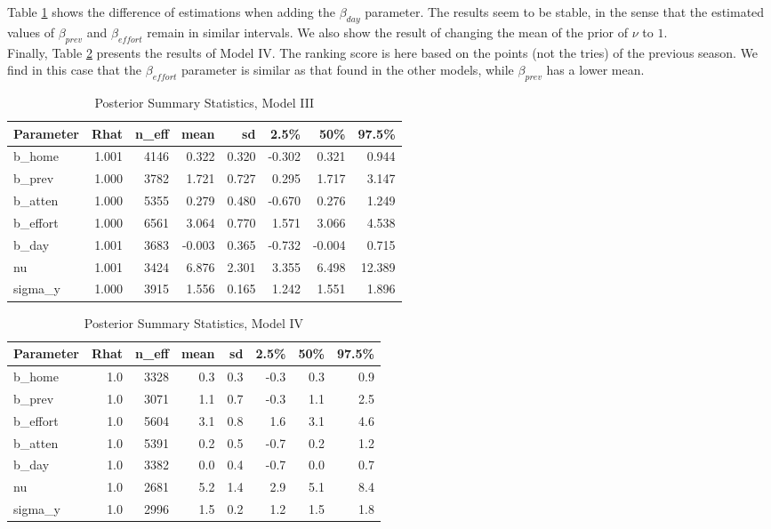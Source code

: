 \documentclass[]{article}
\begin{document}
Table \ref{postmodelIII} shows the difference of estimations when adding the $\beta_{day}$ parameter. The results seem to be stable, in the sense that the estimated values of $\beta_{prev}$ and $\beta_{effort}$ remain in similar intervals. We also show the result of changing the mean of the prior of $\nu$ to $1$.\\
 
Finally, Table \ref{postmodelIV} presents the results of Model IV. The ranking score is here based on the points (not the tries) of the previous season. We find in this case that the $\beta_{effort}$ parameter is similar as that found in the other models, while $\beta_{prev}$ has a lower mean.\\ 

\begin{table}[ht]
	\centering
	\caption{Posterior Summary Statistics, Model III}
	\begin{tabular}{lrrrrrrr}
		\toprule
		Parameter & Rhat & n\_eff & mean & sd & 2.5\% & 50\% & 97.5\% \\ 
		\midrule
		b\_home & 1.001 & 4146 & 0.322 & 0.320 & -0.302 & 0.321 & 0.944 \\ 
		b\_prev & 1.000 & 3782 & 1.721 & 0.727 & 0.295 & 1.717 & 3.147 \\ 
		b\_atten & 1.000 & 5355 & 0.279 & 0.480 & -0.670 & 0.276 & 1.249 \\ 
		b\_effort & 1.000 & 6561 & 3.064 & 0.770 & 1.571 & 3.066 & 4.538 \\ 
		b\_day & 1.001 & 3683 & -0.003 & 0.365 & -0.732 & -0.004 & 0.715 \\ 
		nu & 1.001 & 3424 & 6.876 & 2.301 & 3.355 & 6.498 & 12.389 \\ 
		sigma\_y & 1.000 & 3915 & 1.556 & 0.165 & 1.242 & 1.551 & 1.896 \\ 
		\bottomrule
	\end{tabular}
	\label{postmodelIII}
\end{table}

\begin{table}[ht]
	\centering
	\caption{Posterior Summary Statistics, Model IV}
	\begin{tabular}{lrrrrrrr}
		\toprule
		Parameter & Rhat & n\_eff & mean & sd & 2.5\% & 50\% & 97.5\% \\ 
		\midrule
		b\_home & 1.0 & 3328 & 0.3 & 0.3 & -0.3 & 0.3 & 0.9 \\ 
		b\_prev & 1.0 & 3071 & 1.1 & 0.7 & -0.3 & 1.1 & 2.5 \\ 
		b\_effort & 1.0 & 5604 & 3.1 & 0.8 & 1.6 & 3.1 & 4.6 \\ 
		b\_atten & 1.0 & 5391 & 0.2 & 0.5 & -0.7 & 0.2 & 1.2 \\ 
		b\_day & 1.0 & 3382 & 0.0 & 0.4 & -0.7 & 0.0 & 0.7 \\ 
		nu & 1.0 & 2681 & 5.2 & 1.4 & 2.9 & 5.1 & 8.4 \\ 
		sigma\_y & 1.0 & 2996 & 1.5 & 0.2 & 1.2 & 1.5 & 1.8 \\ 
		\bottomrule
	\end{tabular}
	\label{postmodelIV}
\end{table}
\end{document}

